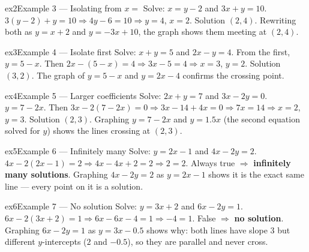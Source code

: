 \documentclass[11pt]{article}
\begin{document}
\begin{example}{ex2}{Example 3 --- Isolating from $x=$}
Solve: $x=y-2$ and $3x+y=10$.
\soln $3(y-2)+y=10\Rightarrow 4y-6=10\Rightarrow y=4$, $x=2$. Solution $(2,4)$. Rewriting both as $y=x+2$ and $y=-3x+10$, the graph shows them meeting at $(2,4)$.
\end{example}

\begin{example}{ex3}{Example 4 --- Isolate first}
Solve: $x+y=5$ and $2x-y=4$.
\soln From the first, $y=5-x$. Then $2x-(5-x)=4\Rightarrow 3x-5=4\Rightarrow x=3$, $y=2$. Solution $(3,2)$. The graph of $y=5-x$ and $y=2x-4$ confirms the crossing point.
\end{example}

\begin{example}{ex4}{Example 5 --- Larger coefficients}
Solve: $2x+y=7$ and $3x-2y=0$.
\soln $y=7-2x$. Then $3x-2(7-2x)=0\Rightarrow 3x-14+4x=0\Rightarrow 7x=14\Rightarrow x=2$, $y=3$. Solution $(2,3)$. Graphing $y=7-2x$ and $y=1.5x$ (the second equation solved for $y$) shows the lines crossing at $(2,3)$.
\end{example}

\begin{example}{ex5}{Example 6 --- Infinitely many}
Solve: $y=2x-1$ and $4x-2y=2$.
\soln $4x-2(2x-1)=2\Rightarrow 4x-4x+2=2\Rightarrow 2=2$. Always true $\Rightarrow$ \textbf{infinitely many solutions}. Graphing $4x-2y=2$ as $y=2x-1$ shows it is the exact same line --- every point on it is a solution.
\end{example}

\begin{example}{ex6}{Example 7 --- No solution}
Solve: $y=3x+2$ and $6x-2y=1$.
\soln $6x-2(3x+2)=1\Rightarrow 6x-6x-4=1\Rightarrow -4=1$. False $\Rightarrow$ \textbf{no solution}. Graphing $6x-2y=1$ as $y=3x-0.5$ shows why: both lines have slope $3$ but different $y$-intercepts ($2$ and $-0.5$), so they are parallel and never cross.
\end{example}
\end{document}

